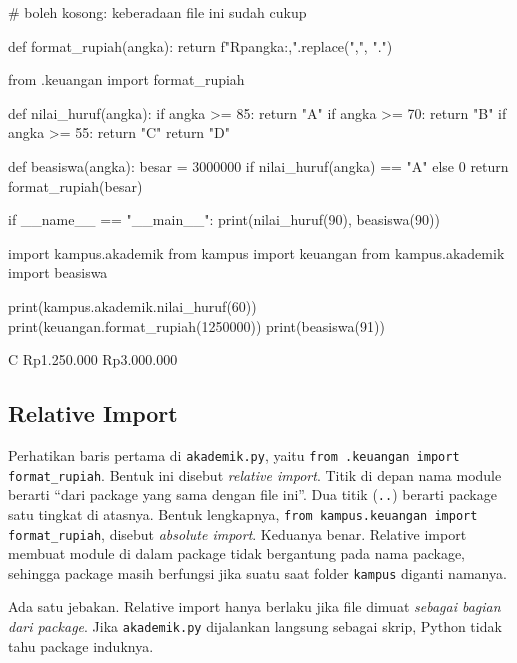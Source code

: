 \begin{kode}
# boleh kosong: keberadaan file ini sudah cukup
\end{kode}

\begin{kode}
def format_rupiah(angka):
    return f"Rp{angka:,}".replace(",", ".")
\end{kode}

\begin{kode}
from .keuangan import format_rupiah

def nilai_huruf(angka):
    if angka >= 85:
        return "A"
    if angka >= 70:
        return "B"
    if angka >= 55:
        return "C"
    return "D"

def beasiswa(angka):
    besar = 3000000 if nilai_huruf(angka) == "A" else 0
    return format_rupiah(besar)

if __name__ == "__main__":
    print(nilai_huruf(90), beasiswa(90))
\end{kode}

\begin{kode}[main.py]
import kampus.akademik
from kampus import keuangan
from kampus.akademik import beasiswa

print(kampus.akademik.nilai_huruf(60))
print(keuangan.format_rupiah(1250000))
print(beasiswa(91))
\end{kode}

\begin{keluaran}
C
Rp1.250.000
Rp3.000.000
\end{keluaran}

\subsection{Relative Import}

Perhatikan baris pertama di \texttt{akademik.py}, yaitu \texttt{from .keuangan import format\_rupiah}. Bentuk ini disebut \emph{relative import}. Titik di depan nama module berarti ``dari package yang sama dengan file ini''. Dua titik (\texttt{..}) berarti package satu tingkat di atasnya. Bentuk lengkapnya, \texttt{from kampus.keuangan import format\_rupiah}, disebut \emph{absolute import}. Keduanya benar. Relative import membuat module di dalam package tidak bergantung pada nama package, sehingga package masih berfungsi jika suatu saat folder \texttt{kampus} diganti namanya.

Ada satu jebakan. Relative import hanya berlaku jika file dimuat \emph{sebagai bagian dari package}. Jika \texttt{akademik.py} dijalankan langsung sebagai skrip, Python tidak tahu package induknya.

